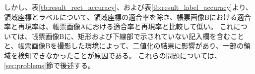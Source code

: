 しかし、表\ref{tb:result_rect_accuracy}、および表\ref{tb:result_label_accuracy}より、領域座標とラベルについて、領域座標の適合率を除き、帳票画像Bにおける適合率と再現率は、帳票画像Aにおける適合率と再現率と比較して低い。
これについては、帳票画像Bに、矩形および下線部で示されていない記入欄を含むことと、帳票画像Bを撮影した環境によって、二値化の結果に影響があり、一部の領域を検知できなかったことが原因である。
これらの問題については、\ref{sec:problems}節で後述する。









